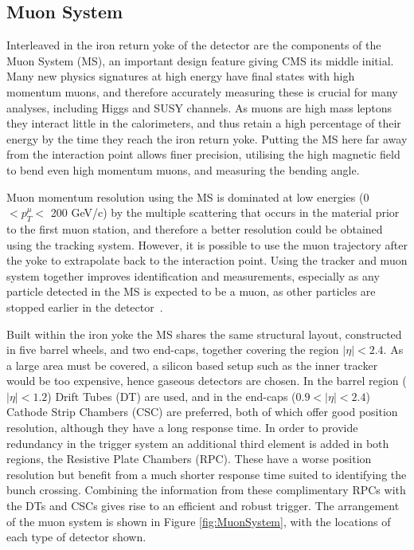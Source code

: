 \subsection{Muon System}

Interleaved in the iron return yoke of the detector are the components of the Muon System (MS), an important design feature giving CMS its middle initial. Many new physics signatures at high energy have final states with high momentum muons, and therefore accurately measuring these is crucial for many analyses, including Higgs and SUSY channels. As muons are high mass leptons they interact little in the calorimeters, and thus retain a high percentage of their energy by the time they reach the iron return yoke. Putting the MS here far away from the interaction point allows finer precision, utilising the high magnetic field to bend even high momentum muons, and measuring the bending angle.

Muon momentum resolution using the MS is dominated at low energies (0 $< p^{\mu}_{T} < $ 200 GeV/c) by the multiple scattering that occurs in the material prior to the first muon station, and therefore a better resolution could be obtained using the tracking system. However, it is possible to use the muon trajectory after the yoke to extrapolate back to the interaction point. Using the tracker and muon system together improves identification and measurements, especially as any particle detected in the MS is expected to be a muon, as other particles are stopped earlier in the detector~\cite{MuonTDR}. 

Built within the iron yoke the MS shares the same structural layout, constructed in five barrel wheels, and two end-caps, together covering the region $|\eta| < 2.4$. As a large area must be covered, a silicon based setup such as the inner tracker would be too expensive, hence gaseous detectors are chosen. In the barrel region ($|\eta| < 1.2$) Drift Tubes (DT) are used, and in the end-caps ($0.9 < |\eta| < 2.4$) Cathode Strip Chambers (CSC) are preferred, both of which offer good position resolution, although they have a long response time. In order to provide redundancy in the trigger system an additional third element is added in both regions, the Resistive Plate Chambers (RPC). These have a worse position resolution but benefit from a much shorter response time suited to identifying the bunch crossing. Combining the information from these complimentary RPCs with the DTs and CSCs gives rise to an efficient and robust trigger. The arrangement of the muon system is shown in Figure \ref{fig:MuonSystem}, with the locations of each type of detector shown.

